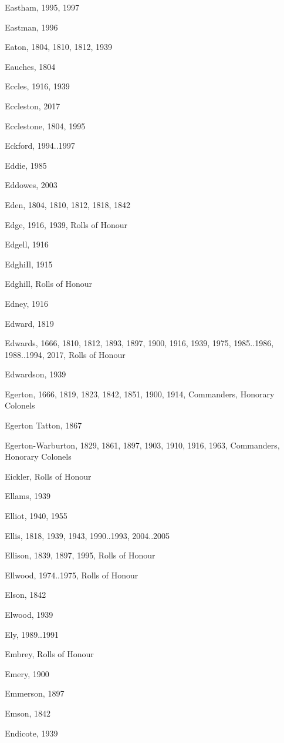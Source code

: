 \begin{theindex}
\item Eastham, 1995, 1997
\item Eastman, 1996
\item Eaton, 1804, 1810, 1812, 1939
\item Eauches, 1804
\item Eccles, 1916, 1939
\item Eccleston, 2017
\item Ecclestone, 1804, 1995
\item Eckford, 1994..1997
\item Eddie, 1985
\item Eddowes, 2003
\item Eden, 1804, 1810, 1812, 1818, 1842
\item Edge, 1916, 1939, Rolls of Honour
\item Edgell, 1916
\item EdghiIl, 1915
\item Edghill, Rolls of Honour
\item Edney, 1916
\item Edward, 1819
\item Edwards, 1666, 1810, 1812, 1893, 1897, 1900, 1916, 1939, 1975, 1985..1986, 1988..1994, 2017, Rolls of Honour
\item Edwardson, 1939
\item Egerton, 1666, 1819, 1823, 1842, 1851, 1900, 1914, Commanders, Honorary Colonels
\item Egerton Tatton, 1867
\item Egerton-Warburton, 1829, 1861, 1897, 1903, 1910, 1916, 1963, Commanders, Honorary Colonels
\item Eickler, Rolls of Honour
\item Ellams, 1939
\item Elliot, 1940, 1955
\item Ellis, 1818, 1939, 1943, 1990..1993, 2004..2005
\item Ellison, 1839, 1897, 1995, Rolls of Honour
\item Ellwood, 1974..1975, Rolls of Honour
\item Elson, 1842
\item Elwood, 1939
\item Ely, 1989..1991
\item Embrey, Rolls of Honour
\item Emery, 1900
\item Emmerson, 1897
\item Emson, 1842
\item Endicote, 1939

\end{theindex}
